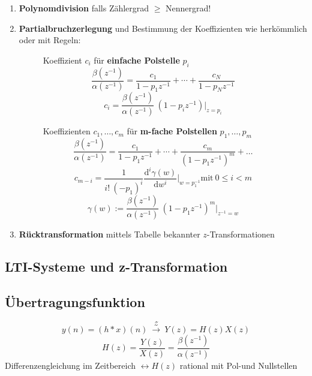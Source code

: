 \documentclass[10pt,a4paper]{article}
\newcommand{\ztransform}{
	~\xrightarrow{~\mathcal{Z}~}~
}
\begin{document}
\begin{enumerate}
\item \textbf{Polynomdivision} falls Zählergrad $\geq$ Nennergrad!
\item \textbf{Partialbruchzerlegung} und Bestimmung der Koeffizienten wie herkömmlich oder mit Regeln:
\begin{figure}[H]
	\centering
	\setlength{\fboxsep}{10pt}
	\begin{adjustbox}{valign=h,center=0.42\textwidth,margin=1ex,minipage=[t][][t]{0.37\textwidth},bgcolor=white,cfbox=black 1.5pt 0pt 1pt}
		Koeffizient $c_i$ für \textbf{einfache Polstelle} $p_i$
		\[ \frac{\beta(z^{-1})}{\alpha(z^{-1})} = \frac{c_1}{1 - p_1 z^{-1}} + \cdots + \frac{c_N}{1 - p_N z^{-1}} \]
		\[ c_i = \frac{\beta(z^{-1})}{\alpha(z^{-1})} ~ (1 - p_i z^{-1}) \bigg |_{z = p_{i}} \]
		\vspace{3.8em}
	\end{adjustbox}
	\begin{adjustbox}{valign=h,center=0.48\textwidth,margin=1ex,minipage=[t][][t]{0.43\textwidth},bgcolor=white,cfbox=black 1.5pt 0pt 1pt}
		Koeffizienten $c_1, \ldots, c_m$ für \textbf{m-fache Polstellen} $p_1, \ldots, p_m$
		\[ \frac{\beta(z^{-1})}{\alpha(z^{-1})}=\frac{c_{1}}{1-p_{1}z^{-1}}+\cdots+\frac{c_{m}}{(1-p_{1}z^{-1})^m} + \ldots \]
		\[ c_{m - i} = \frac{1}{i! ~ (-p_1)^{i}}\frac{\mathrm d^{i} \gamma(w)}{\mathrm d w^{i}} \bigg |_{w = p_1^{-1}} \text{mit} ~ 0 \leq i < m \]
		\[ \gamma(w) := \frac{\beta(z^{-1})}{\alpha(z^{-1})} ~ \left(1 - p_1 z^{-1} \right)^m \bigg |_{z^{-1} = w} \]
	\end{adjustbox}
\end{figure}

\item \textbf{Rücktransformation} mittels Tabelle bekannter $z$-Transformationen

\end{enumerate}

\subsection*{LTI-Systeme und z-Transformation}
\subsection*{Übertragungsfunktion}
\begin{multicols}{2}
	
	\[y(n)=(h*x)(n)\ztransform Y(z)=H(z)X(z)\]
	\[H(z)=\frac{Y(z)}{X(z)}=\frac{\beta(z^{-1})}{\alpha(z^{-1})}\]
	Differenzengleichung im Zeitbereich $\leftrightarrow H(z)$ rational mit Pol-und Nullstellen\\
\end{multicols}
\end{document}
